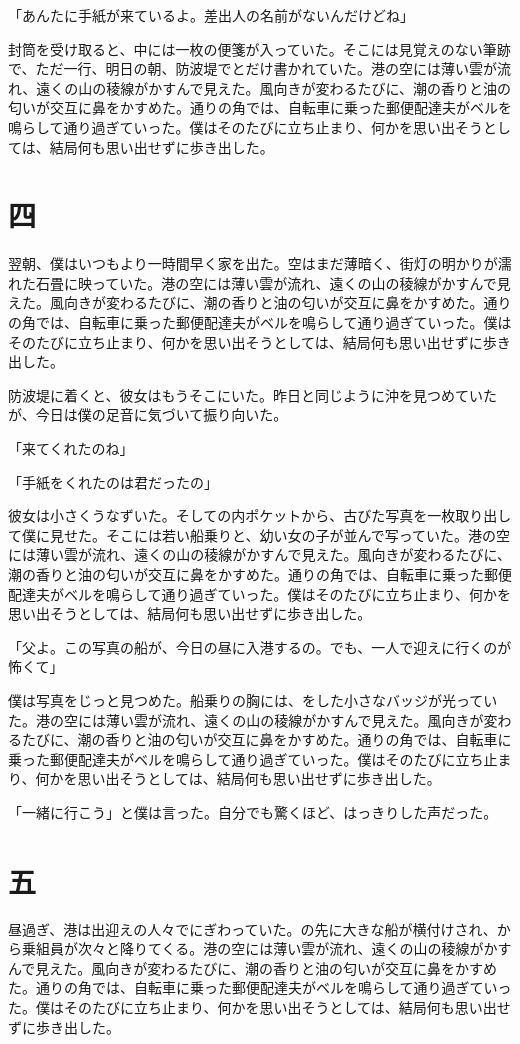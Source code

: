 \documentclass[tate,paper=a5,fontsize=10pt]{jlreq}
\begin{document}
「あんたに手紙が来ているよ。差出人の名前がないんだけどね」

封筒を受け取ると、中には一枚の便箋が入っていた。そこには見覚えのない筆跡で、ただ一行、明日の朝、防波堤でとだけ書かれていた。港の空には薄い雲が流れ、遠くの山の稜線がかすんで見えた。風向きが変わるたびに、潮の香りと油の匂いが交互に鼻をかすめた。通りの角では、自転車に乗った郵便配達夫がベルを鳴らして通り過ぎていった。僕はそのたびに立ち止まり、何かを思い出そうとしては、結局何も思い出せずに歩き出した。

\section*{四}
翌朝、僕はいつもより一時間早く家を出た。空はまだ薄暗く、街灯の明かりが濡れた石畳に映っていた。港の空には薄い雲が流れ、遠くの山の稜線がかすんで見えた。風向きが変わるたびに、潮の香りと油の匂いが交互に鼻をかすめた。通りの角では、自転車に乗った郵便配達夫がベルを鳴らして通り過ぎていった。僕はそのたびに立ち止まり、何かを思い出そうとしては、結局何も思い出せずに歩き出した。

防波堤に着くと、彼女はもうそこにいた。昨日と同じように沖を見つめていたが、今日は僕の足音に気づいて振り向いた。

「来てくれたのね」

「手紙をくれたのは君だったの」

彼女は小さくうなずいた。そしての内ポケットから、古びた写真を一枚取り出して僕に見せた。そこには若い船乗りと、幼い女の子が並んで写っていた。港の空には薄い雲が流れ、遠くの山の稜線がかすんで見えた。風向きが変わるたびに、潮の香りと油の匂いが交互に鼻をかすめた。通りの角では、自転車に乗った郵便配達夫がベルを鳴らして通り過ぎていった。僕はそのたびに立ち止まり、何かを思い出そうとしては、結局何も思い出せずに歩き出した。

「父よ。この写真の船が、今日の昼に入港するの。でも、一人で迎えに行くのが怖くて」

僕は写真をじっと見つめた。船乗りの胸には、をした小さなバッジが光っていた。港の空には薄い雲が流れ、遠くの山の稜線がかすんで見えた。風向きが変わるたびに、潮の香りと油の匂いが交互に鼻をかすめた。通りの角では、自転車に乗った郵便配達夫がベルを鳴らして通り過ぎていった。僕はそのたびに立ち止まり、何かを思い出そうとしては、結局何も思い出せずに歩き出した。

「一緒に行こう」と僕は言った。自分でも驚くほど、はっきりした声だった。

\section*{五}
昼過ぎ、港は出迎えの人々でにぎわっていた。の先に大きな船が横付けされ、から乗組員が次々と降りてくる。港の空には薄い雲が流れ、遠くの山の稜線がかすんで見えた。風向きが変わるたびに、潮の香りと油の匂いが交互に鼻をかすめた。通りの角では、自転車に乗った郵便配達夫がベルを鳴らして通り過ぎていった。僕はそのたびに立ち止まり、何かを思い出そうとしては、結局何も思い出せずに歩き出した。
\end{document}
